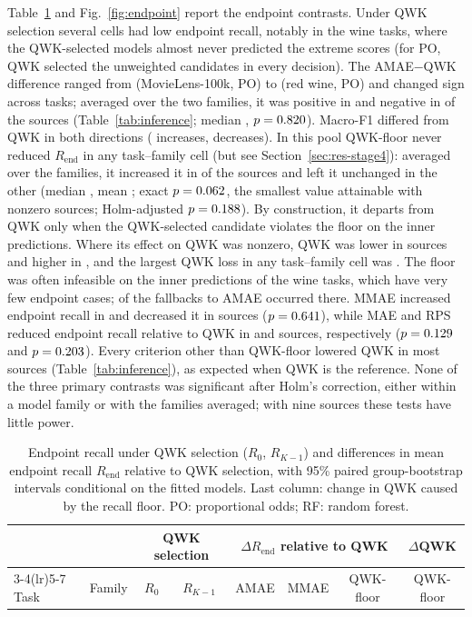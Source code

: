 \documentclass[pdflatex,sn-mathphys-ay]{sn-jnl}
\theoremstyle{thmstyleone}
\theoremstyle{thmstylethree}
\newcommand{\QWKF}{QWK-floor}
\begin{document}
Table~\ref{tab:endpoint} and Fig.~\ref{fig:endpoint} report the endpoint contrasts. Under QWK selection several cells had low endpoint recall, notably in the wine tasks, where the QWK-selected models almost never predicted the extreme scores (for PO, QWK selected the unweighted candidates in every decision). The AMAE$-$QWK difference ranged from \AmaeMin{} (MovieLens-100k, PO) to \AmaeMax{} (red wine, PO) and changed sign across tasks; averaged over the two families, it was positive in \WilPosAmae{} and negative in \WilNegAmae{} of the \NBlocks{} sources (Table~\ref{tab:inference}; median \WilMedAmae{}, $p=0.820$). Macro-F1 differed from QWK in both directions (\WilPosMfone{} increases, \WilNegMfone{} decreases). In this pool \QWKF{} never reduced $R_{\mathrm{end}}$ in any task--family cell (but see Section~\ref{sec:res-stage4}): averaged over the families, it increased it in \WilPosCon{} of the \NBlocks{} sources and left it unchanged in the other \ConZero{} (median \WilMedCon{}, mean \WilMeanCon{}; exact $p=0.062$, the smallest value attainable with \ConNonzero{} nonzero sources; Holm-adjusted $p=0.188$). By construction, it departs from QWK only when the QWK-selected candidate violates the floor on the inner predictions. Where its effect on QWK was nonzero, QWK was lower in \QwkCostNegCon{} sources and higher in \QwkCostPosCon{}, and the largest QWK loss in any task--family cell was \ConQwkCostMaxAbs{}. The floor was often infeasible on the inner predictions of the wine tasks, which have very few endpoint cases; \ConFallbacksWine{} of the \ConFallbacks{} fallbacks to AMAE occurred there. MMAE increased endpoint recall in \WilPosMmae{} and decreased it in \WilNegMmae{} sources ($p=0.641$), while MAE and RPS reduced endpoint recall relative to QWK in \WilNegMae{} and \WilNegRps{} sources, respectively ($p=0.129$ and $p=0.203$). Every criterion other than \QWKF{} lowered QWK in most sources (Table~\ref{tab:inference}), as expected when QWK is the reference. None of the three primary contrasts was significant after Holm's correction, either within a model family or with the families averaged; with nine sources these tests have little power.

\begin{table}[t]
\caption{Endpoint recall under QWK selection ($R_0$, $R_{K-1}$) and differences in mean endpoint recall $R_{\mathrm{end}}$ relative to QWK selection, with 95\% paired group-bootstrap intervals conditional on the fitted models. Last column: change in QWK caused by the recall floor. PO: proportional odds; RF: random forest.}\label{tab:endpoint}
\centering\scriptsize
\setlength{\tabcolsep}{3pt}
\begin{tabular}{@{}llcccccc@{}}
\toprule
& & \multicolumn{2}{c}{QWK selection} & \multicolumn{3}{c}{$\Delta R_{\mathrm{end}}$ relative to QWK} & $\Delta$QWK\\
\cmidrule(lr){3-4}\cmidrule(lr){5-7}
Task & Family & $R_0$ & $R_{K-1}$ & AMAE & MMAE & \QWKF{} & \QWKF{}\\
\midrule

\bottomrule
\end{tabular}
\end{table}
\end{document}
